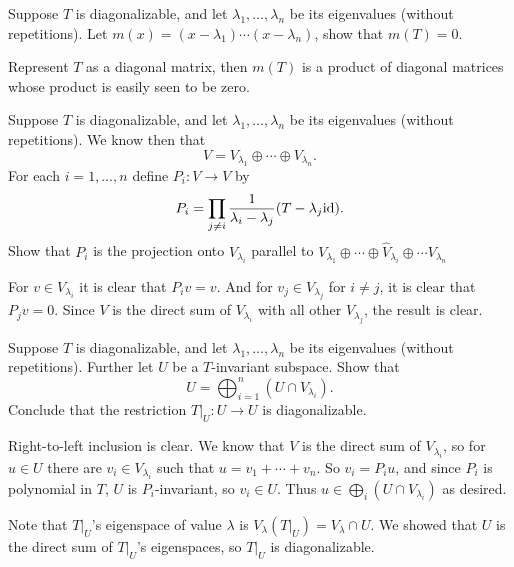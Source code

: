 



\def\printmcount{\the\counter{math counter}}

\bprob

    Suppose $T$ is diagonalizable, and let $\lambda_1,\dots,\lambda_n$ be its eigenvalues (without repetitions).
    Let $m(x)=(x-\lambda_1)\cdots(x-\lambda_n)$, show that $m(T)=0$.

\eprob

Represent $T$ as a diagonal matrix, then $m(T)$ is a product of diagonal matrices whose product is easily seen to be zero.

\bprob

    Suppose $T$ is diagonalizable, and let $\lambda_1,\dots,\lambda_n$ be its eigenvalues (without repetitions).
    We know then that
    $$ V = V_{\lambda_1} \oplus \cdots \oplus V_{\lambda_n} . $$
    For each $i=1,\dots,n$ define $P_i\colon V\to V$ by
    $$ P_i = \prod_{j\neq i}{{1}\over{\lambda_i-\lambda_j}}(T-\lambda_j{\rm id}) . $$
    Show that $P_i$ is the projection onto $V_{\lambda_i}$ parallel to $V_{\lambda_1}\oplus\cdots\oplus\hat V_{\lambda_i}\oplus\cdots V_{\lambda_n}$

\eprob

For $v\in V_{\lambda_i}$ it is clear that $P_iv=v$.
And for $v_j\in V_{\lambda_j}$ for $i\neq j$, it is clear that $P_jv=0$.
Since $V$ is the direct sum of $V_{\lambda_i}$ with all other $V_{\lambda_j}$, the result is clear.

\bprob

    Suppose $T$ is diagonalizable, and let $\lambda_1,\dots,\lambda_n$ be its eigenvalues (without repetitions).
    Further let $U$ be a $T$-invariant subspace.
    Show that
    $$ U = \bigoplus_{i=1}^n(U\cap V_{\lambda_i}) . $$
    Conclude that the restriction $T|_U\colon U\to U$ is diagonalizable.

\eprob

Right-to-left inclusion is clear.
We know that $V$ is the direct sum of $V_{\lambda_i}$, so for $u\in U$ there are $v_i\in V_{\lambda_i}$ such that $u=v_1+\cdots+v_n$.
So $v_i=P_iu$, and since $P_i$ is polynomial in $T$, $U$ is $P_i$-invariant, so $v_i\in U$.
Thus $u\in\bigoplus_i(U\cap V_{\lambda_i})$ as desired.

Note that $T|_U$'s eigenspace of value $\lambda$ is $V_\lambda(T|_U)=V_\lambda\cap U$.
We showed that $U$ is the direct sum of $T|_U$'s eigenspaces, so $T|_U$ is diagonalizable.

\bprob

